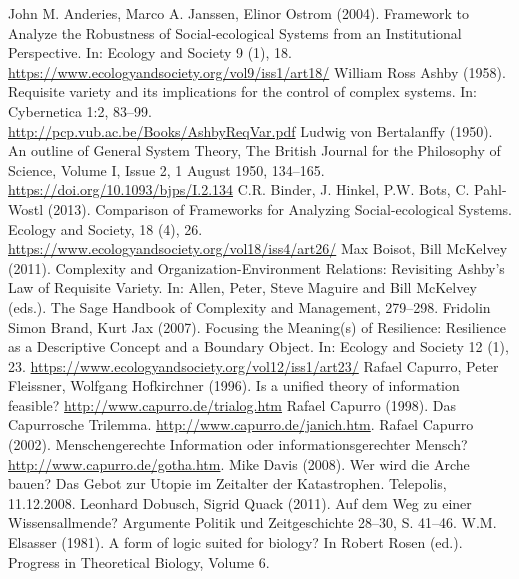 \documentclass[11pt,a4paper]{article}
\begin{document}
\begin{thebibliography}{xxx}
 John M. Anderies, Marco A. Janssen, Elinor Ostrom
  (2004).  Framework to Analyze the Robustness of Social-ecological Systems
  from an Institutional Perspective. In: Ecology and Society 9 (1),
  18.\\ \url{https://www.ecologyandsociety.org/vol9/iss1/art18/}
 William Ross Ashby (1958).  Requisite variety and its
  implications for the control of complex systems. In: Cybernetica 1:2,
  83--99.\\ \url{http://pcp.vub.ac.be/Books/AshbyReqVar.pdf}
 Ludwig von Bertalanffy (1950). An outline of General
  System Theory, The British Journal for the Philosophy of Science, Volume I,
  Issue 2, 1 August 1950, 134–165.\\
  \url{https://doi.org/10.1093/bjps/I.2.134}
 C.R. Binder, J. Hinkel, P.W. Bots, C. Pahl-Wostl (2013).
  Comparison of Frameworks for Analyzing Social-ecological Systems. Ecology
  and Society, 18 (4), 26.  \\
  \url{https://www.ecologyandsociety.org/vol18/iss4/art26/}
 Max Boisot, Bill McKelvey (2011). Complexity and
  Organization-Environment Relations: Revisiting Ashby’s Law of Requisite
  Variety. In: Allen, Peter, Steve Maguire and Bill McKelvey (eds.). The Sage
  Handbook of Complexity and Management, 279--298. 
 Fridolin Simon Brand, Kurt Jax (2007).  Focusing the
  Meaning(s) of Resilience: Resilience as a Descriptive Concept and a Boundary
  Object. In: Ecology and Society 12 (1), 23.
  \url{https://www.ecologyandsociety.org/vol12/iss1/art23/}
 Rafael Capurro, Peter Fleissner, Wolfgang Hofkirchner
  (1996). Is a unified theory of information feasible?
  \url{http://www.capurro.de/trialog.htm}
 Rafael Capurro (1998). Das Capurrosche Trilemma.
  \url{http://www.capurro.de/janich.htm}.
 Rafael Capurro (2002). Menschengerechte Information oder
  informationsgerechter Mensch? \url{http://www.capurro.de/gotha.htm}.
 Mike Davis (2008). Wer wird die Arche bauen?  Das Gebot
  zur Utopie im Zeitalter der Katastrophen.  Telepolis, 11.12.2008.
 Leonhard Dobusch, Sigrid Quack (2011). Auf dem Weg zu
  einer Wissensallmende? Argumente Politik und Zeitgeschichte 28--30,
  S. 41--46.
 W.M. Elsasser (1981). A form of logic suited for
  biology? In Robert Rosen (ed.). Progress in Theoretical Biology, Volume 6.

\end{thebibliography}
\end{document}
